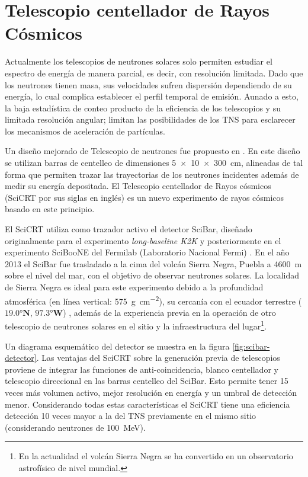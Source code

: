 
\chapter{Telescopio centellador de Rayos Cósmicos}
\label{chap:dos}

Actualmente los telescopios de neutrones solares solo permiten estudiar el espectro de energía de manera parcial, es decir, con resolución limitada. Dado que los neutrones tienen masa, sus velocidades sufren dispersión dependiendo de su energía, lo cual complica establecer el perfil temporal de emisión. Aunado a esto, la baja estadística de conteo producto de la eficiencia de los telescopios y su limitada resolución angular; limitan las posibilidades de los TNS para esclarecer los mecanismos de aceleración de partículas.

Un diseño mejorado de Telescopio de neutrones fue propuesto en \cite{sako03}. En este diseño se utilizan barras de centelleo de dimensiones \SI[product-units=power]{5x10x300}{\cm}, alineadas de tal forma que permiten trazar las trayectorias de los neutrones incidentes además de medir su energía depositada. El Telescopio centellador de Rayos cósmicos (SciCRT por sus siglas en inglés) es un nuevo experimento de rayos cósmicos basado en este principio.

El SciCRT utiliza como trazador activo el detector SciBar, diseñado originalmente para el experimento \emph{long-baseline K2K} \cite{knitta04} y posteriormente en el experimento SciBooNE del Fermilab (Laboratorio Nacional Fermi) \cite{hiraide06}. En el año \num{2013} el SciBar fue trasladado a la cima del volcán Sierra Negra, Puebla a \SI{4600}{\metre} sobre el nivel del mar, con el objetivo de observar neutrones solares. La localidad de Sierra Negra es ideal para este experimento debido a la profundidad atmosférica (en línea vertical: \SI{575}{\gram\per\square\centi\metre}), su cercanía con el ecuador terrestre ($\ang{19.0}\mathbf{N}$, $\ang{97.3}\mathbf{W}$) , además de la experiencia previa en la operación de otro telescopio de neutrones solares en el sitio y la infraestructura del lugar\footnote{En la actualidad el volcán Sierra Negra se ha convertido en un observatorio astrofísico de nivel mundial.}.

Un diagrama esquemático del detector se muestra en la figura \ref{fig:scibar-detector}. Las ventajas del SciCRT sobre la generación previa de telescopios proviene de integrar las funciones de anti-coincidencia, blanco centellador y telescopio direccional en las barras centelleo del SciBar. Esto permite tener \num{15} veces más volumen activo, mejor resolución en energía y un umbral de detección menor. Considerando todas estas características el SciCRT tiene una eficiencia detección \num{10} veces mayor a la del TNS previamente en el mismo sitio \cite{ynagai14} (considerando neutrones de \SI{100}{\mega\electronvolt}).

